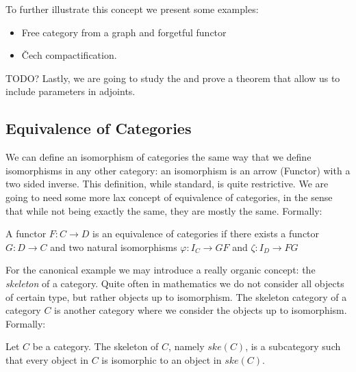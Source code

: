 To further illustrate this concept we present some examples:
\begin{example}
  \begin{itemize}
  \item Free category from a graph and forgetful functor
  \item \v{C}ech compactification.
  \end{itemize}
\end{example}

{\color{red} TODO? Lastly, we are going to study the  and prove a theorem that allow us to include parameters in adjoints.}



\subsection{Equivalence of Categories}
We can define an isomorphism of categories the same way that we define isomorphisms in any other category: an isomorphism is an arrow (Functor) with a two sided inverse. This definition, while standard, is quite restrictive. We are going to need some more lax concept of equivalence of categories, in the sense that while not being exactly the same, they are mostly the same. Formally:

\begin{definition}
A functor $F:C\to D$ is an equivalence of categories if there exists a functor $G:D\to C$  and two natural isomorphisms $\varphi: I_C \to GF$ and $\zeta: I_D\to FG$
\end{definition}


For the canonical example we may introduce a really organic concept: the \emph{skeleton} of a category. Quite often in mathematics we do not consider all objects of certain type, but rather objects up to isomorphism. The skeleton category of a category $C$ is another category where we consider the objects up to isomorphism. Formally:
  \begin{definition}
    Let $C$ be a category. The skeleton of $C$, namely $ske(C)$, is a subcategory  such that every object in $C$ is isomorphic to an object in $ske(C)$.
  \end{definition}

